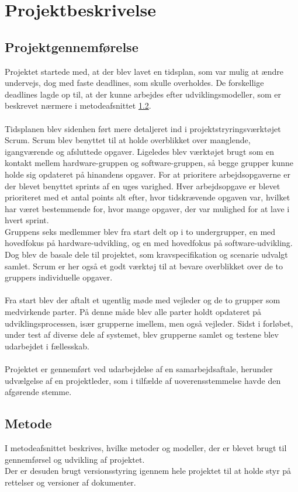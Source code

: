 \chapter{Projektbeskrivelse}

\section{Projektgennemførelse}\label{Projektgennemfoerlse}
Projektet startede med, at der blev lavet en tidsplan, som var mulig at ændre undervejs, dog med faste deadlines, som skulle overholdes. De forskellige deadlines lagde op til, at der kunne arbejdes efter udviklingsmodeller, som er beskrevet nærmere i metodeafsnittet \ref{Metode}.\\ 
\\
Tidsplanen blev sidenhen ført mere detaljeret ind i projektstryringsværktøjet Scrum. Scrum blev benyttet til at holde overblikket over manglende, igangværende og afsluttede opgaver. Ligeledes blev værktøjet brugt som en kontakt mellem hardware-gruppen og software-gruppen, så begge grupper kunne holde sig opdateret på hinandens opgaver. For at prioritere arbejdsopgaverne er der blevet benyttet sprints af en uges varighed. Hver arbejdsopgave er blevet prioriteret med et antal points alt efter, hvor tidskrævende opgaven var, hvilket har været bestemmende for, hvor mange opgaver, der var mulighed for at lave i hvert sprint.\\
Gruppens seks medlemmer blev fra start delt op i to undergrupper, en med hovedfokus på hardware-udvikling, og en med hovedfokus på software-udvikling. Dog blev de basale dele til projektet, som kravspecifikation og scenarie udvalgt samlet. Scrum er her også et godt værktøj til at bevare overblikket over de to gruppers individuelle opgaver.\\ 
\\
Fra start blev der aftalt et ugentlig møde med vejleder og de to grupper som medvirkende parter. På denne måde blev alle parter holdt opdateret på udviklingsprocessen, især grupperne imellem, men også vejleder. Sidst i forløbet, under test af diverse dele af systemet, blev grupperne samlet og testene blev udarbejdet i fællesskab.\\ 
\\
Projektet er gennemført ved udarbejdelse af en samarbejdsaftale, herunder udvælgelse af en projektleder, som i tilfælde af uoverensstemmelse havde den afgørende stemme. 

\section{Metode} \label{Metode}
I metodeafsnittet beskrives, hvilke metoder og modeller, der er blevet brugt til gennemførsel og udvikling af projektet.\\
Der er desuden brugt versionsstyring igennem hele projektet til at holde styr på rettelser og versioner af dokumenter.\\ 

